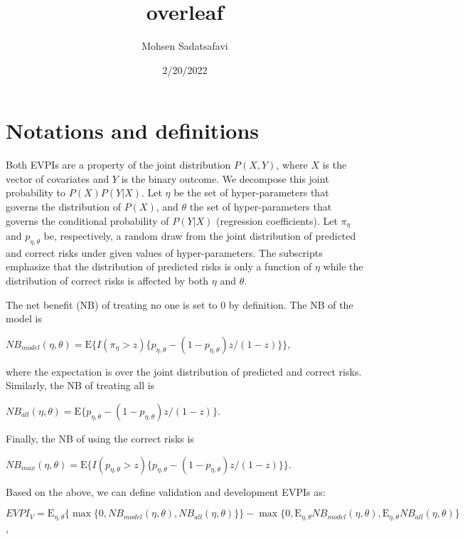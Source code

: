\documentclass[
]{article}
\title{overleaf}
\author{Mohsen Sadatsafavi}
\date{2/20/2022}
\begin{document}
\maketitle

\section{Notations and definitions}

Both EVPIs are a property of the joint distribution \(P(X,Y)\), where
\(X\) is the vector of covariates and \(Y\) is the binary outcome. We
decompose this joint probability to \(P(X)P(Y|X)\). Let \(\eta\) be the
set of hyper-parameters that governs the distribution of \(P(X)\), and
\(\theta\) the set of hyper-parameters that governs the conditional
probability of \(P(Y|X)\) (regression coefficients). Let \(\pi_\eta\)
and \(p_{\eta,\theta}\) be, respectively, a random draw from the joint
distribution of predicted and correct risks under given values of
hyper-parameters. The subscripts emphasize that the distribution of
predicted risks is only a function of \(\eta\) while the distribution of
correct risks is affected by both \(\eta\) and \(\theta\).

The net benefit (NB) of treating no one is set to 0 by definition. The
NB of the model is

\begin{center}
$NB_{model}(\eta,\theta)=\text{E}\{{I(\pi_\eta>z)\{p_{\eta,\theta}-(1-p_{\eta,\theta})z/(1-z)}\}\},$
\end{center}

where the expectation is over the joint distribution of predicted and
correct risks. Similarly, the NB of treating all is

\begin{center}
$NB_{all}(\eta,\theta)=\text{E}{\{p_{\eta,\theta}-(1-p_{\eta,\theta})z/(1-z)}\}.$
\end{center}

Finally, the NB of using the correct risks is

\begin{center}
$NB_{max}(\eta,\theta)=\text{E}\{{I(p_{\eta,\theta}>z)\{p_{\eta,\theta}-(1-p_{\eta,\theta})z/(1-z)}\}\}.$
\end{center}

Based on the above, we can define validation and development EVPIs as:

\begin{center}
$EVPI_V = \text{E}_{\eta,\theta}\{\max\{0, NB_{model}(\eta,\theta), NB_{all}(\eta,\theta)\}\} - \max\{0,\text{E}_{\eta,\theta}NB_{model}(\eta,\theta),\text{E}_{\eta,\theta}NB_{all}(\eta,\theta) \}$,
\end{center}
\end{document}

